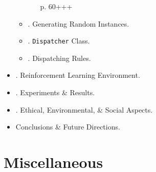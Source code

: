 \documentclass{article}
\begin{document}
\begin{itemize}
\begin{itemize}
\begin{itemize}
            p. 60+++
        \end{itemize}
        \item {. Generating Random Instances.}
        \item {. {\tt Dispatcher} Class.}
        \item {. Dispatching Rules.}
    \end{itemize}
    \item {. Reinforcement Learning Environment.}
    \item {. Experiments \& Results.}
    \item {. Ethical, Environmental, \& Social Aspects.}
    \item {\sf Conclusions \& Future Directions.}
\end{itemize}


\section{Miscellaneous}


\printbibliography[heading=bibintoc]
\end{document}
